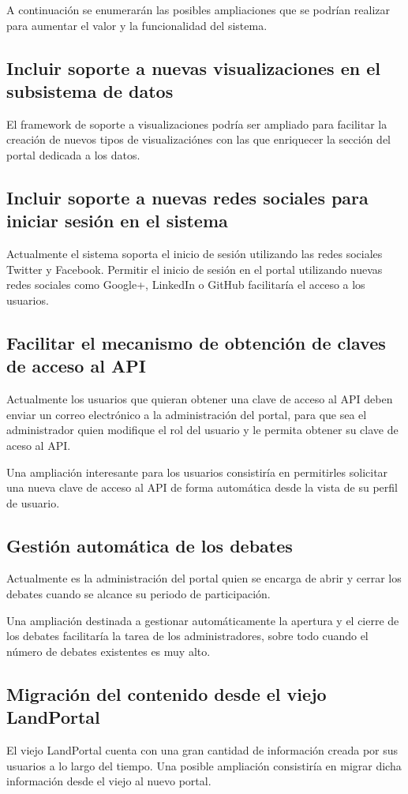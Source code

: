A continuación se enumerarán las posibles ampliaciones que se podrían realizar
para aumentar el valor y la funcionalidad del sistema.


\subsection{Incluir soporte a nuevas visualizaciones en el subsistema de datos}
	El framework de soporte a visualizaciones podría ser ampliado para facilitar
	la creación de nuevos tipos de visualizaciónes con las que enriquecer la
	sección del portal dedicada a los datos.

\subsection{Incluir soporte a nuevas redes sociales para iniciar sesión en el sistema}
	Actualmente el sistema soporta el inicio de sesión utilizando las redes sociales
	Twitter y Facebook.  Permitir el inicio de sesión en el portal utilizando nuevas
	redes sociales como Google+, LinkedIn o GitHub facilitaría el acceso a los
	usuarios.

\subsection{Facilitar el mecanismo de obtención de claves de acceso al API}
	Actualmente los usuarios que quieran obtener una clave de acceso al API
	deben enviar un correo electrónico a la administración del portal, para que
	sea el administrador quien modifique el rol del usuario y le permita obtener
	su clave de aceso al API.
	
	Una ampliación interesante para los usuarios 
	consistiría en permitirles solicitar una nueva clave de acceso al API
	de forma automática desde la vista de su perfil de usuario.

\subsection{Gestión automática de los debates}
	Actualmente es la administración del portal quien se encarga de abrir y cerrar
	los debates cuando se alcance su periodo de participación.
	
	Una ampliación
	destinada a gestionar automáticamente la apertura y el cierre de los debates
	facilitaría la tarea de los administradores, sobre todo cuando el número de
	debates existentes es muy alto.

\subsection{Migración del contenido desde el viejo LandPortal}
	El viejo LandPortal cuenta con una gran cantidad de información creada por sus
	usuarios a lo largo del tiempo.  Una posible ampliación consistiría en migrar
	dicha información desde el viejo al nuevo portal.
	
